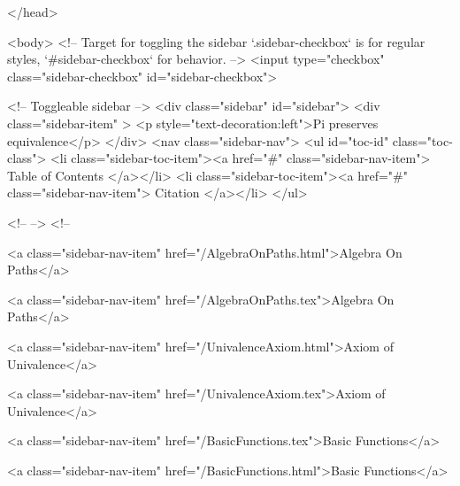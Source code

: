   
</head>




  <body>
    <!-- Target for toggling the sidebar `.sidebar-checkbox` is for regular
     styles, `#sidebar-checkbox` for behavior. -->
<input type="checkbox" class="sidebar-checkbox" id="sidebar-checkbox">

<!-- Toggleable sidebar -->
<div class="sidebar" id="sidebar">
  <div class="sidebar-item" >
    <p style="text-decoration:left">Pi preserves equivalence</p>
  </div>
  <nav class="sidebar-nav">
    <ul id="toc-id" class="toc-class">
  <li class="sidebar-toc-item"><a href="#" class="sidebar-nav-item"> Table of Contents </a></li>
  <li class="sidebar-toc-item"><a href="#" class="sidebar-nav-item"> Citation </a></li>
</ul>


    <!--  -->
    <!-- 
      
    
      
    
      
    
      
        
      
    
      
        
          <a class="sidebar-nav-item" href="/AlgebraOnPaths.html">Algebra On Paths</a>
        
      
    
      
        
          <a class="sidebar-nav-item" href="/AlgebraOnPaths.tex">Algebra On Paths</a>
        
      
    
      
        
          <a class="sidebar-nav-item" href="/UnivalenceAxiom.html">Axiom of Univalence</a>
        
      
    
      
        
          <a class="sidebar-nav-item" href="/UnivalenceAxiom.tex">Axiom of Univalence</a>
        
      
    
      
        
          <a class="sidebar-nav-item" href="/BasicFunctions.tex">Basic Functions</a>
        
      
    
      
        
          <a class="sidebar-nav-item" href="/BasicFunctions.html">Basic Functions</a>
        
      
    
      
        
